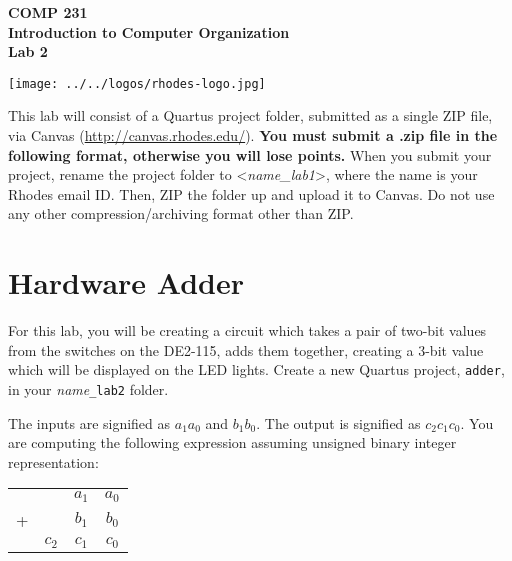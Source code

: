 \documentclass[10pt]{article}
\begin{document}

\hspace{-5mm}
\begin{minipage}{0.65\linewidth}
  \textbf{{\Large COMP 231\\
      Introduction to Computer Organization\\Lab 2}}
\end{minipage}
\begin{minipage}{0.35\linewidth}
  \texttt{[image: ../../logos/rhodes-logo.jpg]}
\end{minipage}

\vspace{.25in}

This lab will consist of a Quartus project folder, submitted as a
single ZIP file, via Canvas (\url{http://canvas.rhodes.edu/}).
{\bf You must submit a .zip file in the following format, otherwise
  you will lose points.} When you submit your project, rename the
project folder to <{\em name\_lab1}>, where the name is your Rhodes
email ID. Then, ZIP the folder up and upload it to Canvas. Do not
use any other compression/archiving format other than ZIP.

\section*{Hardware Adder}

For this lab, you will be creating a circuit which takes a pair of two-bit
values from the switches on the DE2-115, adds them together, creating a 3-bit
value which will be displayed on the LED lights. Create a new Quartus project,
{\tt adder}, in your {\em name}{\tt\_lab2} folder.

The inputs are signified as $a_1 a_0$ and $b_1 b_0$. The output is
signified as $c_2 c_1 c_0$. You are computing the following expression
assuming unsigned binary integer representation:

\begin{center}
\begin{tabular}[h]{cccc}
    &       & $a_1$ & $a_0$ \\
  + &       & $b_1$ & $b_0$ \\\hline
    & $c_2$ & $c_1$ & $c_0$ \\
\end{tabular}
\end{center}
\end{document}
